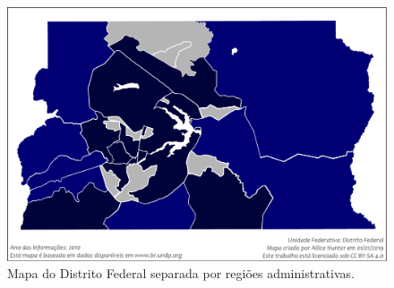 \begin{figure}[h!]
    \centering
    \includegraphics[width=0.6\linewidth]{2-caps/cap02/Mapa_do_IDH_do_Distrito_Federal_(2010)}
    \caption{Mapa do Distrito Federal separada por regiões administrativas.}
    \label{fig:mapadoidhdodistritofederal2010}
\end{figure}

